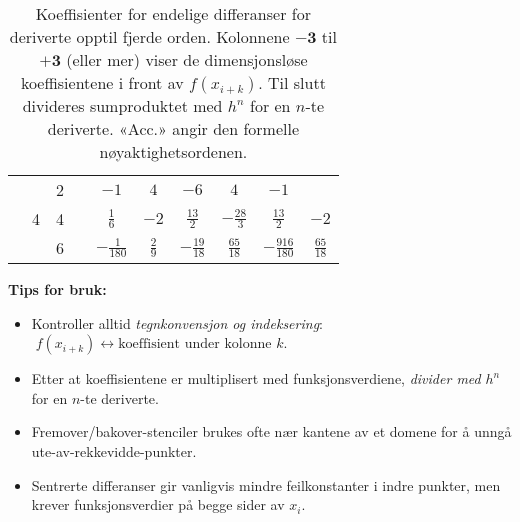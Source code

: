 \begin{table}[H]
\begin{tabular}{|c|c|c|c|c|c|c|c|c|c|}
                                                          & \multirow{3}{*}{4}           & 2                           &                  & $-1$             & $4$             & $-6$             & $4$               & $-1$               &                  \\ \cline{3-10}
                                                          &                              & 4                           &                  & $\frac{1}{6}$    & $-2$            & $\frac{13}{2}$   & $-\frac{28}{3}$   & $\frac{13}{2}$     & $-2$             \\ \cline{3-10}
                                                          &                              & 6                           &                  & $-\frac{1}{180}$ & $\frac{2}{9}$   & $-\frac{19}{18}$ & $\frac{65}{18}$   & $-\frac{916}{180}$ & $\frac{65}{18}$  \\ \hline
    \end{tabular}
    \caption{Koeffisienter for endelige differanser for deriverte opptil fjerde orden.
        Kolonnene \(\mathbf{-3}\) til \(\mathbf{+3}\) (eller mer) viser de dimensjonsløse koeffisientene i front av \(f(x_{i+k})\).
        Til slutt divideres sumproduktet med \(h^n\) for en \(n\)-te deriverte.
        «Acc.» angir den formelle nøyaktighetsordenen.}
    \label{tab:finite_difference_table}
\end{table}

\vspace{1em}

\noindent\textbf{Tips for bruk:}
\begin{itemize}
    \item Kontroller alltid \emph{tegnkonvensjon og indeksering}:
          \(\;f(x_{i+k}) \leftrightarrow \text{koeffisient under kolonne }k\).
    \item Etter at koeffisientene er multiplisert med funksjonsverdiene, \emph{divider med} \(h^n\) for en \(n\)-te deriverte.
    \item Fremover/bakover-stenciler brukes ofte nær kantene av et domene for å unngå ute-av-rekkevidde-punkter.
    \item Sentrerte differanser gir vanligvis mindre feilkonstanter i indre punkter, men krever funksjonsverdier på begge sider av \(x_i\).
\end{itemize}




